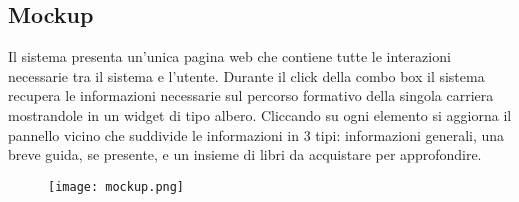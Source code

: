 \subsection{Mockup}
Il sistema presenta un'unica pagina web che contiene tutte le interazioni necessarie tra il sistema e l'utente. Durante il click della combo box il sistema recupera le informazioni necessarie sul percorso formativo della singola carriera mostrandole in un widget di tipo albero. Cliccando su ogni elemento si aggiorna il pannello vicino che suddivide le informazioni in 3 tipi: informazioni generali, una breve guida, se presente, e un insieme di libri da acquistare per approfondire.
\begin{figure}[H]
\begin{center}
 \texttt{[image: mockup.png]}
\end{center}
\end{figure}

